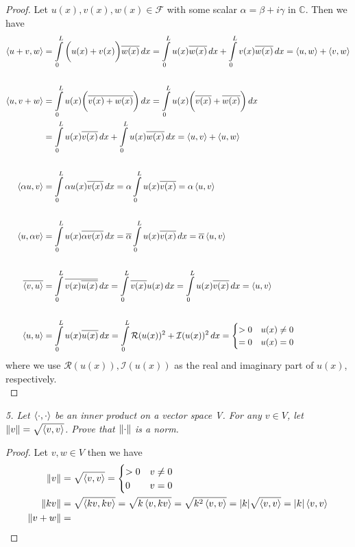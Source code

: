 \documentclass[12pt]{article}
\DeclarePairedDelimiter \abs{\lvert}{\rvert}%
\DeclarePairedDelimiter \norm{\lVert}{\rVert}%
\theoremstyle{remark}
\begin{document}
\begin{proof}
Let $u(x), v(x), w(x) \in \mathcal{F}$ with some scalar $\alpha = \beta + i\gamma$ in $\mathbb{C}$. Then we have 
\begin{align*}
	\braket{u + v, w} & = \int\limits_0^L \bigg(u(x) + v(x)\bigg) \overline{w(x)} \, dx = \int\limits_0^L u(x)\overline{w(x)} \, dx + \int\limits_0^L v(x)\overline{w(x)} \, dx = \braket{u,w} + \braket{v,w} \\ \\
	\braket{u,v+w} & = \int\limits_0^L u(x)\bigg(\overline{v(x) + w(x)}\bigg) \, dx  = \int\limits_0^L u(x)\bigg(\overline{v(x)} + \overline{w(x)}\bigg) \, dx \\
	& = \int\limits_0^L u(x)\overline{v(x)} \, dx + \int\limits_0^L u(x)\overline{w(x)} \, dx = \braket{u,v} + \braket{u,w} \\ \\
	\braket{\alpha u,v} & = \int\limits_0^L \alpha u(x) \overline{v(x)} \, dx  = \alpha\int\limits_0^L u(x)\overline{v(x)} = \alpha\braket{u,v} \\ \\	
	\braket{u,\alpha v} & = \int\limits_0^L u(x)\overline{\alpha v(x)} \, dx = \overline{\alpha}\int\limits_0^L u(x)\overline{v(x)} \, dx = \overline{\alpha}\braket{u,v} \\ \\
	\overline{\braket{v,u}} & = \int\limits_0^L \overline{v(x)\overline{u(x)}} \, dx = \int\limits_0^L \overline{v(x)}u(x) \, dx = \int\limits_0^L u(x)\overline{v(x)} \, dx = \braket{u,v} \\ \\
	\braket{u,u} & = \int\limits_0^L u(x)\overline{u(x)} \, dx = \int\limits_0^L \mathcal{R}(u(x))^2 + \mathcal{I}(u(x))^2 \, dx	=
	\begin{cases}
		>0 & u(x) \neq 0 \\
		=0 & u(x) = 0
	\end{cases}
\end{align*}
where we use $\mathcal{R}(u(x)), \mathcal{I}(u(x))$ as the real and imaginary part of $u(x)$, respectively. \\
\end{proof}

\newpage

\textit{5. Let $\braket{\cdot, \cdot}$ be an inner product on a vector space V. For any $v \in V$, let $\norm{v} = \sqrt{\braket{v,v}}$. Prove that $\norm{\cdot}$ is a norm.} 
\begin{proof}
	Let $v,w \in V$ then we have
	\begin{align*}
		\norm{v} & = \sqrt{\braket{v,v}} =
		\begin{cases}
			>0 & v \neq 0 \\
			0 & v = 0
		\end{cases} \\
		\norm{kv} & = \sqrt{\braket{kv,kv}} = \sqrt{k\braket{v,kv}} = 	 \sqrt{k^2\braket{v,v}} = \abs{k}\sqrt{\braket{v,v}} = \abs{k}\braket{v,v} \\
		\norm{v + w} & = 
	\end{align*} 
\end{proof}
\end{document}
